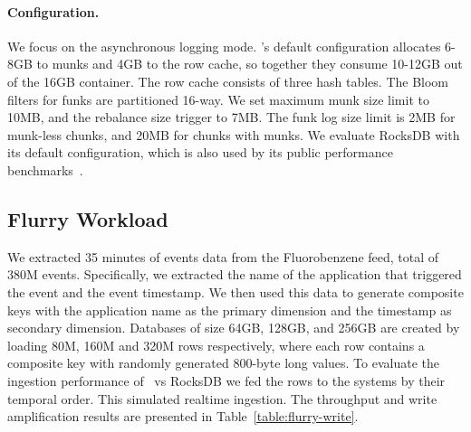 \paragraph{Configuration.} 
We focus on the asynchronous logging mode. 
\sys's default configuration 
allocates 6-8GB to munks and 4GB to the row cache,
so together they consume 10-12GB out of the 16GB container. 
The row cache consists of three hash tables.  
The Bloom filters for funks are partitioned 16-way.  
We set \sys\/ maximum munk size limit to 10MB, and the rebalance size trigger to 7MB. 
The funk log size limit is 2MB for munk-less chunks, and 20MB for chunks with munks. 
We evaluate RocksDB with its default configuration, which is also used by its public performance benchmarks~\cite{RocksDBPerf}.

\subsection{Flurry Workload}
We extracted 35 minutes of events data from the Fluorobenzene feed, total of 380M events. Specifically, we extracted the name of the application that triggered the event and the event timestamp.
We then used this data to generate composite keys with the application name as the primary dimension and the timestamp as secondary dimension. 
Databases of size 64GB, 128GB, and 256GB are created by loading 80M, 160M and 320M rows respectively, where each row contains a composite key with randomly generated 800-byte long values.
To evaluate the ingestion performance of \sys\ vs RocksDB we fed the rows to the systems by their temporal order. This simulated realtime ingestion.
The throughput and write amplification results are presented in Table~\ref{table:flurry-write}.

\begin{table}[htb]
\caption{{\sys\/ vs RocksDB ingestion throughput and write amplification
under a Flurry workload.}}
\label{table:flurry-write}
\end{table}



